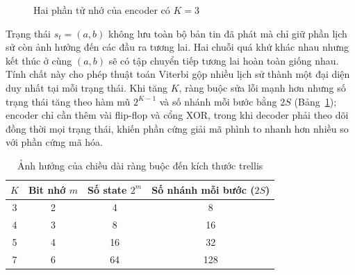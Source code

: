 \documentclass[12pt,a4paper]{article}
\renewcommand{\_}{\originalunderscore\allowbreak}
\begin{document}
\begin{figure}[H]\centering
{}
\caption{Hai phần tử nhớ của encoder có $K=3$}\label{fig:theory-encoder}
\end{figure}

Trạng thái $s_t=(a,b)$ không lưu toàn bộ bản tin đã phát mà chỉ giữ phần lịch sử còn ảnh hưởng đến các đầu ra tương lai. Hai chuỗi quá khứ khác nhau nhưng kết thúc ở cùng $(a,b)$ sẽ có tập chuyển tiếp tương lai hoàn toàn giống nhau. Tính chất này cho phép thuật toán Viterbi gộp nhiều lịch sử thành một đại diện duy nhất tại mỗi trạng thái. Khi tăng $K$, ràng buộc sửa lỗi mạnh hơn nhưng số trạng thái tăng theo hàm mũ $2^{K-1}$ và số nhánh mỗi bước bằng $2S$ (Bảng~\ref{tab:theory-kscale}); encoder chỉ cần thêm vài flip-flop và cổng XOR, trong khi decoder phải theo dõi đồng thời mọi trạng thái, khiến phần cứng giải mã phình to nhanh hơn nhiều so với phần cứng mã hóa.

\begin{table}[H]\centering\small
\begin{tabular}{cccc}\toprule
\textbf{$K$}&\textbf{Bit nhớ $m$}&\textbf{Số state $2^m$}&\textbf{Số nhánh mỗi bước ($2S$)}\\\midrule
3&2&4&8\\4&3&8&16\\5&4&16&32\\7&6&64&128\\\bottomrule
\end{tabular}
\caption{Ảnh hưởng của chiều dài ràng buộc đến kích thước trellis}\label{tab:theory-kscale}
\end{table}
\end{document}

